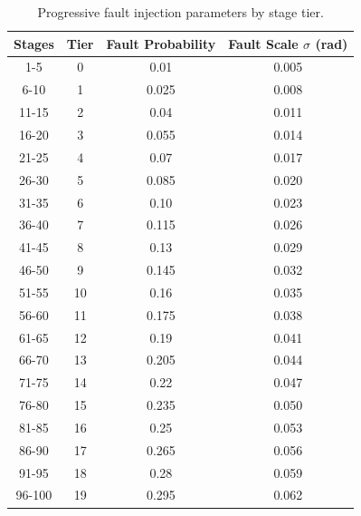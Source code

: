 \documentclass[12pt,a4paper,oneside]{report}
\begin{document}
\begin{table}[H]
\centering

\caption{Progressive fault injection parameters by stage tier.}
\label{tab:fault_tiers}
\begin{tabular}{cccc}
\toprule

\textbf{Stages} & \textbf{Tier} & \textbf{Fault Probability} & \textbf{Fault Scale $\sigma$ (rad)} \\
\midrule

1-5 & 0 & 0.01 & 0.005 \\

6-10 & 1 & 0.025 & 0.008 \\

11-15 & 2 & 0.04 & 0.011 \\

16-20 & 3 & 0.055 & 0.014 \\

21-25 & 4 & 0.07 & 0.017 \\

26-30 & 5 & 0.085 & 0.020 \\

31-35 & 6 & 0.10 & 0.023 \\

36-40 & 7 & 0.115 & 0.026 \\

41-45 & 8 & 0.13 & 0.029 \\

46-50 & 9 & 0.145 & 0.032 \\

51-55 & 10 & 0.16 & 0.035 \\

56-60 & 11 & 0.175 & 0.038 \\

61-65 & 12 & 0.19 & 0.041 \\

66-70 & 13 & 0.205 & 0.044 \\

71-75 & 14 & 0.22 & 0.047 \\

76-80 & 15 & 0.235 & 0.050 \\

81-85 & 16 & 0.25 & 0.053 \\

86-90 & 17 & 0.265 & 0.056 \\

91-95 & 18 & 0.28 & 0.059 \\

96-100 & 19 & 0.295 & 0.062 \\
\bottomrule

\end{tabular}
\end{table}
\end{document}
